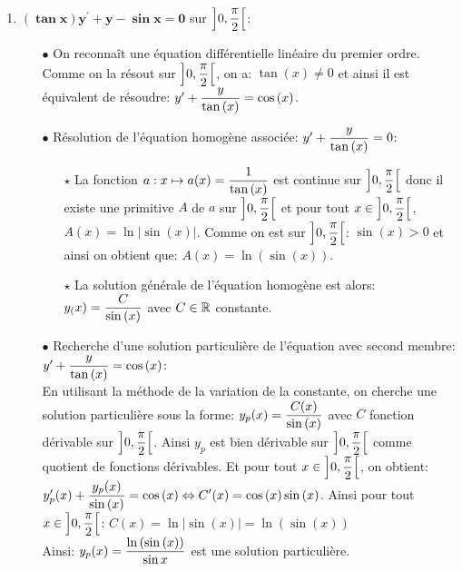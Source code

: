 \documentclass[a4paper, 11pt,reqno]{article}
\begin{document}
\begin{correction}
\begin{enumerate}
\item \textbf{$\mathbf{(\tan{x})y^{\prime}+y-\sin{x}=0}$} sur $\left\rbrack 0,\displaystyle\frac{\pi}{2}\right\lbrack$:\\
\begin{itemize}
\item[$\bullet$] On reconna\^{i}t une \'equation diff\'erentielle lin\'eaire du premier ordre.\\
\noindent Comme on la r\'esout sur $\left\rbrack 0,\displaystyle\frac{\pi}{2}\right\lbrack$, on a: $\tan{(x)}\not= 0$ et ainsi il est \'equivalent de r\'esoudre: $y^{\prime}+\displaystyle\frac{y}{\tan{(x)}}=\cos{(x)}$.
\item[$\bullet$] R\'esolution de l'\'equation homog\`{e}ne associ\'ee: $y^{\prime}+\displaystyle\frac{y}{\tan{(x)}}=0$:
\begin{itemize}
\item[$\star$] La fonction $a: x\mapsto a(x)=\displaystyle\frac{1}{\tan{(x)}}$ est continue sur $\left\rbrack 0,\displaystyle\frac{\pi}{2}\right\lbrack$ donc il existe une primitive $A$ de $a$ sur $\left\rbrack 0,\displaystyle\frac{\pi}{2}\right\lbrack$ et pour tout $x\in\left\rbrack 0,\displaystyle\frac{\pi}{2}\right\lbrack$, $A(x)=\ln{|\sin{(x)}|}$. Comme on est sur $\left\rbrack 0,\displaystyle\frac{\pi}{2}\right\lbrack$: $\sin{(x)}>0$ et ainsi on obtient que: $A(x)=\ln{(\sin{(x)})}$.
\item[$\star$] La solution g\'en\'erale de l'\'equation homog\`{e}ne est alors: $y_(x)= \displaystyle\frac{C}{\sin{(x)}}$ avec $C\in\mathbb{R}$ constante.
\end{itemize}
\item[$\bullet$] Recherche d'une solution particuli\`{e}re de l'\'equation avec second membre: $y^{\prime}+\displaystyle\frac{y}{\tan{(x)}}=\cos{(x)}$:\\
\noindent En utilisant la m\'ethode de la variation de la constante, on cherche une solution particuli\`{e}re sous la forme: $y_p(x)=  \displaystyle\frac{C(x)}{\sin{(x)}}$ avec $C$ fonction d\'erivable sur $\left\rbrack 0,\displaystyle\frac{\pi}{2}\right\lbrack$. Ainsi $y_p$ est bien d\'erivable sur $\left\rbrack 0,\displaystyle\frac{\pi}{2}\right\lbrack$ comme quotient de fonctions d\'erivables. Et pour tout $x\in\left\rbrack 0,\displaystyle\frac{\pi}{2}\right\lbrack$, on obtient: $y^{\prime}_p(x)+\displaystyle\frac{y_p(x)}{\sin{(x)}}=\cos{(x)}\Leftrightarrow C^{\prime}(x)=\cos{(x)}\sin{(x)}$. Ainsi pour tout $x\in\left\rbrack 0,\displaystyle\frac{\pi}{2}\right\lbrack$: $C(x)=\ln{|\sin{(x)}|}=\ln{(\sin{(x)})}$\\
\noindent Ainsi: $y_p(x)= \displaystyle\frac{\ln{(\sin{(x)})}}{\sin{x}}$ est une solution particuli\`{e}re.

\end{itemize}
\end{enumerate}
\end{correction}
\end{document}
